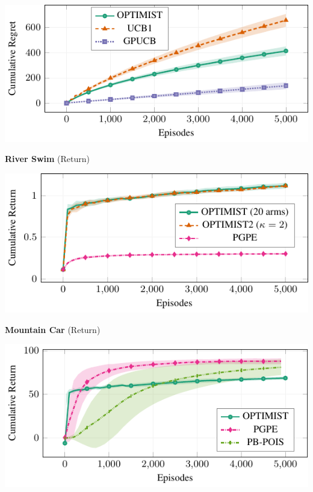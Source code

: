 \documentclass[landscape,a0paper,fontscale=0.35]{baposter}
\begin{document}
\begin{poster}
{\begin{center}
		\begin{minipage}{.85\textwidth}
			\includegraphics[width=\textwidth]{plots/lqg_mu/plot.pdf}
		\end{minipage}
		
		\textbf{River Swim} (Return)
		
		\begin{minipage}{.85\textwidth}
			\includegraphics[width=\textwidth]{plots/riverswim/plot_main.pdf}
		\end{minipage}
		
		\textbf{Mountain Car} (Return)
		
		\begin{minipage}{.85\textwidth}
			\includegraphics[width=\textwidth]{plots/mc/plot.pdf}
		\end{minipage}
	\end{center}

}
\end{poster}
\end{document}
